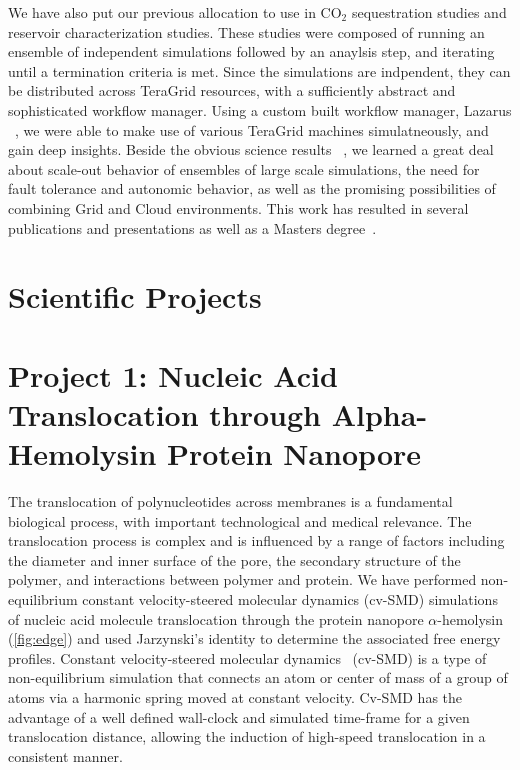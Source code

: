 \documentclass[a4paper,10pt]{article}
\begin{document}
We have also put our previous allocation to use in CO$_2$ sequestration studies
and reservoir characterization studies. These studies were composed of running an ensemble
of independent simulations followed by an anaylsis step, and iterating until a termination criteria is met.
Since the simulations are indpendent, they can be distributed across TeraGrid resources, with
a sufficiently abstract and sophisticated workflow manager. Using a custom built workflow manager,
Lazarus ~\cite{gmac}, we were able to make use of various TeraGrid machines simulatneously, and
gain deep insights. Beside the obvious science results ~\cite{TG10yye00}, we learned a great
deal about scale-out behavior of ensembles of large scale simulations, the need for fault
tolerance and autonomic behavior, as well as the promising possibilities of combining
Grid and Cloud environments. This work has resulted in several publications \cite{Cloud1,Cloud2,MSEScience,TG10yye00}  and presentations
as well as a Masters degree~\cite{Elkhamra2009}.


\section{Scientific Projects}



\section*{Project 1: Nucleic Acid Translocation through Alpha-Hemolysin Protein Nanopore}

The translocation of polynucleotides across membranes is a fundamental biological process, with important technological and medical relevance.  The translocation process is complex and is influenced by a range of factors including the diameter and inner surface of the pore, the secondary structure of the polymer, and interactions between polymer and protein. We have performed non-equilibrium constant velocity-steered molecular dynamics (cv-SMD) simulations of nucleic acid molecule translocation through the protein nanopore $\alpha$-hemolysin (\ref{fig:edge}) and used Jarzynski's identity%
to determine the associated free energy profiles. Constant velocity-steered molecular dynamics~\cite{namd} (cv-SMD) is a type of non-equilibrium simulation that connects an atom or center of mass of a group of atoms via a harmonic spring moved at constant velocity. Cv-SMD has the advantage of a well defined wall-clock and simulated time-frame for a given translocation distance, allowing the induction of high-speed translocation in a consistent manner.
\end{document}
